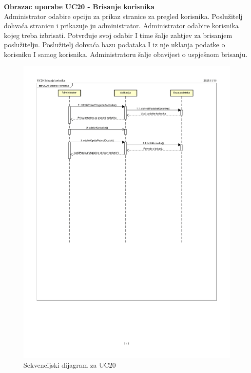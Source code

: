 				\eject
				
				
				\textbf{\large Obrazac uporabe UC20 - Brisanje korisnika}\\
				
				Administrator odabire opciju za prikaz stranice za pregled korisnika. Poslužitelj dohvaća stranicu i prikazuje ju administrator. Administrator odabire korisnika kojeg treba izbrisati. Potvrđuje svoj odabir I time šalje zahtjev za brisanjem poslužitelju. Poslužitelj dohvaća bazu podataka I iz nje uklanja podatke o korisniku I samog korisnika. Administratoru šalje obavijest o uspješnom brisanju.
				
				\begin{figure}[H]
						\includegraphics[scale=0.7]{slike/uc20-1.PNG} %
						\centering
						\caption{Sekvencijski dijagram za UC20}
						\label{fig:promjene}
				\end{figure}

